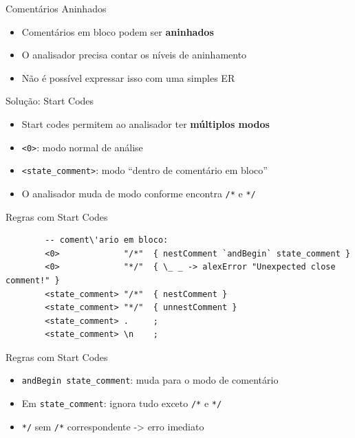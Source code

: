 \begin{frame}{Comentários Aninhados}

    \begin{itemize}

        \item
        Comentários em bloco podem ser \textbf{aninhados}
        \item
        O analisador precisa contar os níveis de aninhamento
        \item
        Não é possível expressar isso com uma simples ER
    \end{itemize}
\end{frame}

\begin{frame}[fragile]{Solução: Start Codes}

    \begin{itemize}

        \item
        Start codes permitem ao analisador ter \textbf{múltiplos modos}
        \item
        \texttt{<0>}: modo normal de análise
        \item
        \texttt{<state\_comment>}: modo ``dentro de
        comentário em bloco''
        \item
        O analisador muda de modo conforme encontra
        \texttt{/*} e \texttt{*/}
    \end{itemize}
\end{frame}

\begin{frame}[fragile]{Regras com Start Codes}

    \begin{lstlisting}
        -- coment\'ario em bloco:
        <0>             "/*"  { nestComment `andBegin` state_comment }
        <0>             "*/"  { \_ _ -> alexError "Unexpected close comment!" }
        <state_comment> "/*"  { nestComment }
        <state_comment> "*/"  { unnestComment }
        <state_comment> .     ;
        <state_comment> \n    ;
    \end{lstlisting}
\end{frame}

\begin{frame}[fragile]{Regras com Start Codes}

    \begin{itemize}

        \item
        \texttt{andBegin state\_comment}: muda para o modo de
        comentário
        \item
        Em \texttt{state\_comment}: ignora tudo exceto
        \texttt{/*} e \texttt{*/}
        \item
        \texttt{*/} sem \texttt{/*}
        correspondente -> erro imediato
    \end{itemize}
\end{frame}

